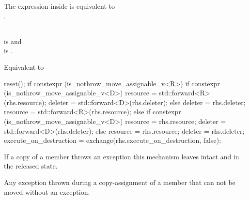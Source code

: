 \documentclass[ebook,11pt,article]{memoir}
\begin{document}
\begin{itemdescr}
\pnum
\remarks
The expression inside  is equivalent to \\
 \tcode{\&\&} .

\pnum
\requires \\ is 
and\\
 is .

\pnum
\effects Equivalent to
\begin{codeblock}
    reset();
    if constexpr (is_nothrow_move_assignable_v<R>) {
        if constexpr (is_nothrow_move_assignable_v<D>) {
            resource = std::forward<R>(rhs.resource); 
            deleter  = std::forward<D>(rhs.deleter); 
        } else {
            deleter  = rhs.deleter; 
            resource = std::forward<R>(rhs.resource); 
        }
    } else {
        if constexpr (is_nothrow_move_assignable_v<D>) {
            resource = rhs.resource; 
            deleter  = std::forward<D>(rhs.deleter); 
        } else {
            resource = rhs.resource; 
            deleter  = rhs.deleter; 
        }
    }
    execute_on_destruction = exchange(rhs.execute_on_destruction, false);
\end{codeblock}

%

\pnum
\begin{note}
If a copy of a member throws an exception this mechanism leaves  intact and  in the released state.
\end{note}

\pnum
\throws Any exception thrown during a copy-assignment of a member that can not be moved without an exception.
\end{itemdescr}
\end{document}
